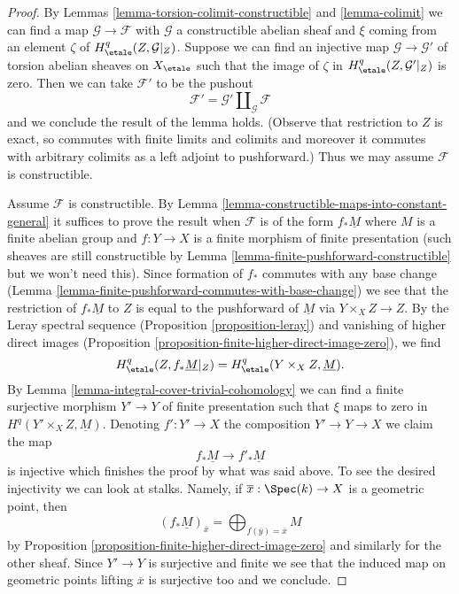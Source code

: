\begin{proof}
By Lemmas \ref{lemma-torsion-colimit-constructible} and \ref{lemma-colimit}
we can find a map $\mathcal{G} \to \mathcal{F}$ with $\mathcal{G}$
a constructible abelian sheaf and $\xi$ coming from an element $\zeta$ of
$H^q_\etale(Z, \mathcal{G}|_Z)$. Suppose we can find an injective map
$\mathcal{G} \to \mathcal{G}'$ of torsion abelian sheaves on $X_\etale$
such that the image of $\zeta$ in $H^q_\etale(Z, \mathcal{G}'|_Z)$ is zero.
Then we can take $\mathcal{F}'$ to be the pushout
$$
\mathcal{F}' = \mathcal{G}' \amalg_{\mathcal{G}} \mathcal{F}
$$
and we conclude the result of the lemma holds. (Observe that restriction
to $Z$ is exact, so commutes with finite limits and colimits and moreover
it commutes with arbitrary colimits as a left adjoint to pushforward.)
Thus we may assume $\mathcal{F}$ is constructible.

\medskip\noindent
Assume $\mathcal{F}$ is constructible. By
Lemma \ref{lemma-constructible-maps-into-constant-general}
it suffices to prove the result when $\mathcal{F}$
is of the form $f_*\underline{M}$ where $M$ is a finite abelian group
and $f : Y \to X$ is a finite morphism of finite presentation
(such sheaves are still constructible by
Lemma \ref{lemma-finite-pushforward-constructible}
but we won't need this).
Since formation of $f_*$ commutes with any base change
(Lemma \ref{lemma-finite-pushforward-commutes-with-base-change})
we see that the restriction of $f_*\underline{M}$ to $Z$ is
equal to the pushforward of $\underline{M}$ via
$Y \times_X Z \to Z$. By the Leray spectral sequence
(Proposition \ref{proposition-leray})
and vanishing of higher direct images
(Proposition \ref{proposition-finite-higher-direct-image-zero}),
we find
$$
H^q_\etale(Z, f_*\underline{M}|_Z) = H^q_\etale(Y \times_X Z, \underline{M}).
$$
By Lemma \ref{lemma-integral-cover-trivial-cohomology}
we can find a finite surjective morphism $Y' \to Y$ of finite presentation
such that $\xi$ maps to zero in $H^q(Y' \times_X Z, \underline{M})$.
Denoting $f' : Y' \to X$ the composition $Y' \to Y \to X$ we claim
the map
$$
f_*\underline{M} \longrightarrow f'_*\underline{M}
$$
is injective which finishes the proof by what was said above.
To see the desired injectivity we can look at stalks. Namely,
if $\overline{x} : \Spec(k) \to X$ is a geometric point, then
$$
(f_*\underline{M})_{\overline{x}} =
\bigoplus\nolimits_{f(\overline{y}) = \overline{x}} M
$$
by Proposition \ref{proposition-finite-higher-direct-image-zero}
and similarly for the other sheaf.
Since $Y' \to Y$ is surjective and finite we see that
the induced map on geometric points lifting $\overline{x}$ is
surjective too and we conclude.
\end{proof}

